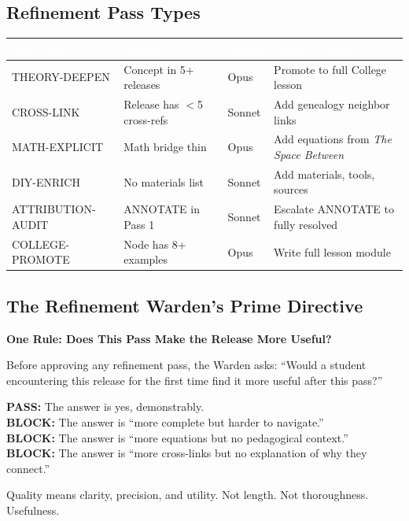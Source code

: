 \documentclass[11pt,letterpaper]{article}
\newcommand{\tblhdr}[1]{\textbf{\sffamily\textcolor{white}{#1}}}
\begin{document}
\subsection{Refinement Pass Types}

\begin{center}
\begin{tabularx}{\textwidth}{L{3.5cm}XL{2cm}L{3cm}}
\toprule
{}
\tblhdr{Pass Type} & \tblhdr{Trigger} & \tblhdr{Model} & \tblhdr{What It Does} \\
\midrule
THEORY-DEEPEN & Concept in 5+ releases & Opus & Promote to full College lesson \\
CROSS-LINK & Release has $<$5 cross-refs & Sonnet & Add genealogy neighbor links \\
MATH-EXPLICIT & Math bridge thin & Opus & Add equations from \textit{The Space Between} \\
DIY-ENRICH & No materials list & Sonnet & Add materials, tools, sources \\
ATTRIBUTION-AUDIT & ANNOTATE in Pass 1 & Sonnet & Escalate ANNOTATE to fully resolved \\
COLLEGE-PROMOTE & Node has 8+ examples & Opus & Write full lesson module \\
\bottomrule
\end{tabularx}
\end{center}

\subsection{The Refinement Warden's Prime Directive}

\begin{amberbox}
\textbf{\sffamily\textcolor{colorC}{One Rule: Does This Pass Make the Release More Useful?}}

Before approving any refinement pass, the Warden asks: ``Would a student encountering this
release for the first time find it more useful after this pass?''

\medskip
\textbf{PASS:} The answer is yes, demonstrably.\\
\textbf{BLOCK:} The answer is ``more complete but harder to navigate.''\\
\textbf{BLOCK:} The answer is ``more equations but no pedagogical context.''\\
\textbf{BLOCK:} The answer is ``more cross-links but no explanation of why they connect.''

\medskip
Quality means clarity, precision, and utility. Not length. Not thoroughness. Usefulness.
\end{amberbox}
\end{document}
